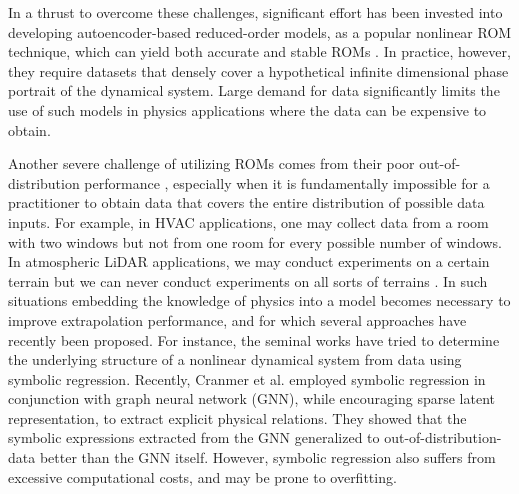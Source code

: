         
        In a thrust to overcome these challenges, significant effort has been invested into developing autoencoder-based reduced-order models, as a popular nonlinear ROM technique, which can yield both accurate and stable ROMs \cite{lee2020model,gin2021deep,champion2019data,kim2019deep}. In practice, however, they require datasets that densely cover a hypothetical infinite dimensional phase portrait of the dynamical system. Large demand for data significantly limits the use of such models in physics applications where the data can be expensive to obtain.
    

        Another severe challenge of utilizing ROMs comes from their poor out-of-distribution performance \cite{fries2022lasdi,cranmer2020discovering,gin2021deep}, especially when it is fundamentally impossible for a practitioner to obtain data that covers the entire distribution of possible data inputs. For example, in HVAC applications, one may collect data from a room with two windows but not from one room for every possible number of windows. In atmospheric LiDAR applications, we may conduct experiments on a certain terrain but we can never conduct experiments on all sorts of terrains \cite{nabi2020improving}. In such situations embedding the knowledge of physics into a model becomes necessary to improve extrapolation performance, and for which several approaches have recently been proposed.
        For instance, the seminal works \cite{bongard2007automated,schmidt2009distilling} have tried to determine the underlying structure of a nonlinear dynamical system from data using symbolic regression. Recently, Cranmer et al. \cite{cranmer2020discovering} employed symbolic regression in conjunction with graph neural network (GNN), while encouraging sparse latent representation, to extract explicit physical relations. They showed that the symbolic expressions extracted from the GNN generalized to out-of-distribution- data better than the GNN itself. However, symbolic regression also suffers from excessive computational costs,  and may be prone to overfitting.

      

